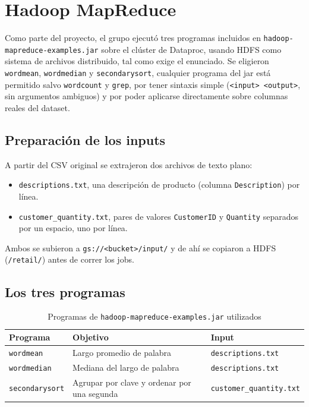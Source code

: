 \section{Hadoop MapReduce}
\label{sec:hadoop}

Como parte del proyecto, el grupo ejecutó tres programas incluidos en \texttt{hadoop-mapreduce-examples.jar} sobre el clúster de Dataproc, usando HDFS como sistema de archivos distribuido, tal como exige el enunciado. Se eligieron \texttt{wordmean}, \texttt{wordmedian} y \texttt{secondarysort}, cualquier programa del jar está permitido salvo \texttt{wordcount} y \texttt{grep}, por tener sintaxis simple (\texttt{<input> <output>}, sin argumentos ambiguos) y por poder aplicarse directamente sobre columnas reales del dataset.

\subsection{Preparación de los inputs}

A partir del CSV original se extrajeron dos archivos de texto plano:

\begin{itemize}
    \item \texttt{descriptions.txt}, una descripción de producto (columna \texttt{Description}) por línea.
    \item \texttt{customer\_quantity.txt}, pares de valores \texttt{CustomerID} y \texttt{Quantity} separados por un espacio, uno por línea.
\end{itemize}

Ambos se subieron a \texttt{gs://<bucket>/input/} y de ahí se copiaron a HDFS (\texttt{/retail/}) antes de correr los jobs.

\subsection{Los tres programas}

\begin{table}[H]
\centering
\begin{tabular}{lll}
\toprule
\textbf{Programa} & \textbf{Objetivo} & \textbf{Input} \\
\midrule
\texttt{wordmean} & Largo promedio de palabra & \texttt{descriptions.txt} \\
\texttt{wordmedian} & Mediana del largo de palabra & \texttt{descriptions.txt} \\
\texttt{secondarysort} & Agrupar por clave y ordenar por una segunda & \texttt{customer\_quantity.txt} \\
\bottomrule
\end{tabular}
\caption{Programas de \texttt{hadoop-mapreduce-examples.jar} utilizados}
\end{table}

